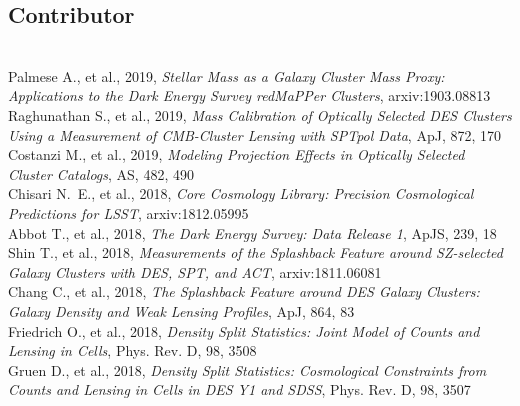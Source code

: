 \documentclass{res}
\begin{document}
\begin{resume}
\section{Contributor}
\vspace{-8pt}
\hrulefill\\
Palmese A., et al., 2019, {\it Stellar Mass as a Galaxy Cluster Mass Proxy: Applications to the Dark Energy Survey redMaPPer Clusters}, arxiv:1903.08813\\
Raghunathan S., et al., 2019, {\it Mass Calibration of Optically Selected DES Clusters Using a Measurement of CMB-Cluster Lensing with SPTpol Data}, ApJ, 872, 170\\
Costanzi M., et al., 2019, {\it Modeling Projection Effects in Optically Selected Cluster Catalogs}, AS, 482, 490\\
Chisari N.~E., et al., 2018, {\it Core Cosmology Library: Precision Cosmological Predictions for LSST}, arxiv:1812.05995\\
Abbot T., et al., 2018, {\it The Dark Energy Survey: Data Release 1}, ApJS, 239, 18\\
Shin T., et al., 2018, {\it Measurements of the Splashback Feature around SZ-selected Galaxy Clusters with DES, SPT, and ACT}, arxiv:1811.06081\\
Chang C., et al., 2018, {\it The Splashback Feature around DES Galaxy Clusters: Galaxy Density and Weak Lensing Profiles}, ApJ, 864, 83\\
Friedrich O., et al., 2018, {\it Density Split Statistics: Joint Model of Counts and Lensing in Cells},  Phys. Rev. D, 98, 3508\\
Gruen D., et al., 2018, {\it Density Split Statistics: Cosmological Constraints from Counts and Lensing in Cells in DES Y1 and SDSS}, Phys. Rev. D, 98, 3507


\end{resume}
\end{document}
